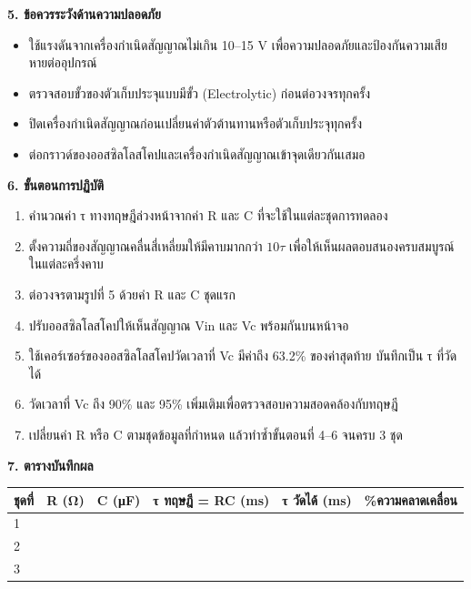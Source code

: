 \textbf{5. ข้อควรระวังด้านความปลอดภัย}

\begin{itemize}
    \item ใช้แรงดันจากเครื่องกำเนิดสัญญาณไม่เกิน 10–15 V เพื่อความปลอดภัยและป้องกันความเสียหายต่ออุปกรณ์
    \item ตรวจสอบขั้วของตัวเก็บประจุแบบมีขั้ว (Electrolytic) ก่อนต่อวงจรทุกครั้ง
    \item ปิดเครื่องกำเนิดสัญญาณก่อนเปลี่ยนค่าตัวต้านทานหรือตัวเก็บประจุทุกครั้ง
    \item ต่อกราวด์ของออสซิลโลสโคปและเครื่องกำเนิดสัญญาณเข้าจุดเดียวกันเสมอ
\end{itemize}

\textbf{6. ขั้นตอนการปฏิบัติ}

\begin{enumerate}
    \item คำนวณค่า τ ทางทฤษฎีล่วงหน้าจากค่า R และ C ที่จะใช้ในแต่ละชุดการทดลอง
    \item ตั้งความถี่ของสัญญาณคลื่นสี่เหลี่ยมให้มีคาบมากกว่า $10\tau$ เพื่อให้เห็นผลตอบสนองครบสมบูรณ์ในแต่ละครึ่งคาบ
    \item ต่อวงจรตามรูปที่ 5 ด้วยค่า R และ C ชุดแรก
    \item ปรับออสซิลโลสโคปให้เห็นสัญญาณ Vin และ Vc พร้อมกันบนหน้าจอ
    \item ใช้เคอร์เซอร์ของออสซิลโลสโคปวัดเวลาที่ Vc มีค่าถึง 63.2\% ของค่าสุดท้าย บันทึกเป็น τ ที่วัดได้
    \item วัดเวลาที่ Vc ถึง 90\% และ 95\% เพิ่มเติมเพื่อตรวจสอบความสอดคล้องกับทฤษฎี
    \item เปลี่ยนค่า R หรือ C ตามชุดข้อมูลที่กำหนด แล้วทำซ้ำขั้นตอนที่ 4–6 จนครบ 3 ชุด
\end{enumerate}

\textbf{7. ตารางบันทึกผล}

\begin{table}[htbp]
    \centering
    \begin{tabular}{llllll}
        \hline
        \textbf{ชุดที่} & \textbf{R (Ω)} & \textbf{C (μF)} & \textbf{τ ทฤษฎี = RC (ms)} & \textbf{τ วัดได้ (ms)} & \textbf{\%ความคลาดเคลื่อน} \\
        \hline
        1 &  &  &  &  &  \\
        2 &  &  &  &  &  \\
        3 &  &  &  &  &  \\
        \hline
    \end{tabular}
\end{table}

